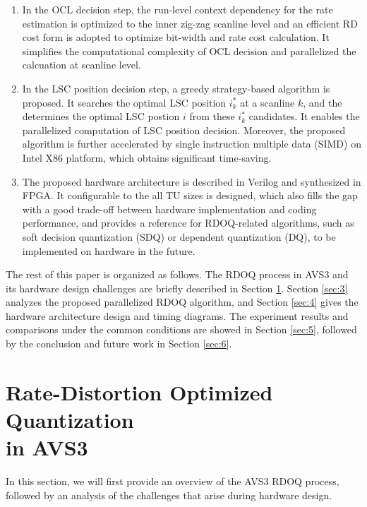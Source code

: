 \documentclass[lettersize,journal]{IEEEtran}
\begin{document}
\begin{enumerate}[]
	\item In the OCL decision step, the run-level context dependency for the rate estimation is optimized to the inner zig-zag scanline level and an efficient RD cost form is adopted to optimize bit-width and rate cost calculation. It simplifies the computational complexity of OCL decision and parallelized the calcuation at scanline level.
	\item In the LSC position decision step, a greedy strategy-based algorithm is proposed. It searches the optimal LSC position $i_{k}^{*}$ at a scanline $k$, and the determines the optimal LSC postion $i$ from these $i_{k}^{*}$ candidates. It enables the parallelized computation of LSC position decision. Moreover, the proposed algorithm is further accelerated by single instruction multiple data (SIMD) on Intel X86 platform, which obtains significant time-saving. 
	\item The proposed hardware architecture is described in Verilog and synthesized in FPGA. It configurable to the all TU sizes is designed, which also fills the gap with a good trade-off between hardware implementation and coding performance, and provides a reference for RDOQ-related algorithms, such as soft decision quantization (SDQ) or dependent quantization (DQ), to be implemented on hardware in the future.
\end{enumerate}
\par
The rest of this paper is organized as follows. The RDOQ process in AVS3 and its hardware design challenges are briefly described in Section \ref{sec:2}. Section \ref{sec:3} analyzes the proposed parallelized RDOQ algorithm, and Section \ref{sec:4} gives the hardware architecture design and timing diagrams. The experiment results and comparisons under the common conditions are showed in Section \ref{sec:5}, followed by the conclusion and future work in Section \ref{sec:6}. 

\section{Rate-Distortion Optimized Quantization \\ in AVS3}
\label{sec:2}
In this section, we will first provide an overview of the AVS3 RDOQ process, followed by an analysis of the challenges that arise during hardware design. 
\end{document}
